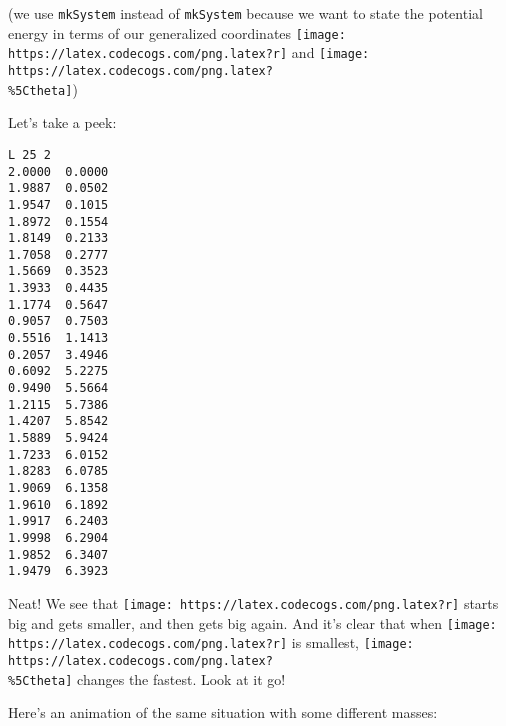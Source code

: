 \documentclass[]{article}
\newenvironment{Shaded}{}{}
\newcommand{\CommentTok}[1]{\textcolor[rgb]{0.38,0.63,0.69}{\textit{#1}}}
\newcommand{\DataTypeTok}[1]{\textcolor[rgb]{0.56,0.13,0.00}{#1}}
\newcommand{\DecValTok}[1]{\textcolor[rgb]{0.25,0.63,0.44}{#1}}
\newcommand{\FloatTok}[1]{\textcolor[rgb]{0.25,0.63,0.44}{#1}}
\newcommand{\FunctionTok}[1]{\textcolor[rgb]{0.02,0.16,0.49}{#1}}
\newcommand{\NormalTok}[1]{#1}
\newcommand{\OtherTok}[1]{\textcolor[rgb]{0.00,0.44,0.13}{#1}}
\begin{document}
(we use \texttt{mkSystem} instead of \texttt{mkSystem\textquotesingle{}} because
we want to state the potential energy in terms of our generalized coordinates
\texttt{[image: https://latex.codecogs.com/png.latex?r]} and
\texttt{[image: https://latex.codecogs.com/png.latex?\\\%5Ctheta]})

Let's take a peek:

\begin{Shaded}
\end{Shaded}

\begin{verbatim}
L 25 2
2.0000  0.0000
1.9887  0.0502
1.9547  0.1015
1.8972  0.1554
1.8149  0.2133
1.7058  0.2777
1.5669  0.3523
1.3933  0.4435
1.1774  0.5647
0.9057  0.7503
0.5516  1.1413
0.2057  3.4946
0.6092  5.2275
0.9490  5.5664
1.2115  5.7386
1.4207  5.8542
1.5889  5.9424
1.7233  6.0152
1.8283  6.0785
1.9069  6.1358
1.9610  6.1892
1.9917  6.2403
1.9998  6.2904
1.9852  6.3407
1.9479  6.3923
\end{verbatim}

Neat! We see that \texttt{[image: https://latex.codecogs.com/png.latex?r]}
starts big and gets smaller, and then gets big again. And it's clear that when
\texttt{[image: https://latex.codecogs.com/png.latex?r]} is smallest,
\texttt{[image: https://latex.codecogs.com/png.latex?\\\%5Ctheta]} changes the
fastest. Look at it go!

Here's an animation of the same situation with some different masses:
\end{document}
